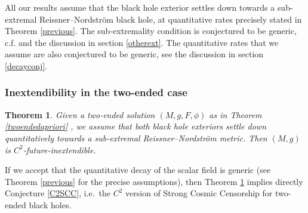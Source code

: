 \documentclass[10pt,a4paper]{article}
\theoremstyle{plain}
\newtheorem{theo}{Theorem}
\theoremstyle{remark}
\theoremstyle{definition}
\theoremstyle{plain}
\theoremstyle{remark}
\theoremstyle{definition}
\numberwithin{equation}{section}
\begin{document}
 All our results assume that the black hole exterior settles down towards a sub-extremal Reissner--Nordstr\"{o}m black hole, at quantitative rates precisely stated in Theorem \ref{previous}. The sub-extremality condition is conjectured to be generic, c.f. \cite{Kommemi} and the discussion in section \ref{otherext}. The quantitative rates that we assume are also conjectured to be generic, see the discussion in section \ref{decayconj}.
 \subsubsection{Inextendibility in the two-ended case}
 
 \begin{theo}  \label{rough2}
 	Given a two-ended solution $(M,g,F,\phi)$ as in Theorem \ref{twoendedapriori} , we assume that both black hole exteriors settle down quantitatively towards a sub-extremal Reissner--Nordstr\"{o}m metric. Then $(M,g)$ is $C^2$-future-inextendible.
 \end{theo}
 
 If we accept that the quantitative decay of the scalar field is generic (see Theorem \ref{previous} for the precise assumptions), then Theorem \ref{rough2} implies directly Conjecture \ref{C2SCC}, i.e.\ the $C^2$ version of Strong Cosmic Censorship for two-ended black holes.
 
\end{document}
